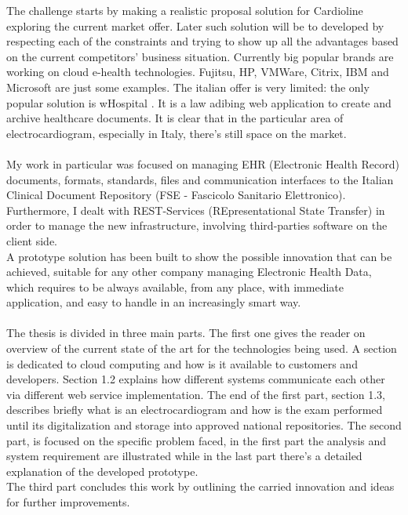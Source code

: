 The challenge starts by making a realistic proposal solution for Cardioline exploring the current market offer. Later such solution will be to developed by respecting each of the constraints and trying to show up all the advantages based on the current competitors' business situation. Currently big popular brands are working on cloud e-health technologies. Fujitsu, HP, VMWare, Citrix, IBM and Microsoft are just some examples. The italian offer is very limited: the only popular solution is wHospital \cite{whospital}. It is a law adibing web application to create and archive healthcare documents. It is clear that in the particular area of electrocardiogram, especially in Italy, there's still space on the market.\\ \\My work in particular was focused on managing EHR (Electronic Health Record) documents, formats, standards, files and communication interfaces to the Italian Clinical Document Repository (FSE - Fascicolo Sanitario Elettronico). Furthermore, I dealt with REST-Services (REpresentational State Transfer) in order to manage the new infrastructure, involving third-parties software on the client side.\\A prototype solution has been built to show the possible innovation that can be achieved, suitable for any other company managing Electronic Health Data, which requires to be always available, from any place, with immediate application, and easy to handle in an increasingly smart way.\\ \\
The thesis is divided in three main parts. The first one gives the reader on overview of the current state of the art for the technologies being used. A section is dedicated to cloud computing and how is it available to customers and developers. Section 1.2 explains how different systems communicate each other via different web service implementation. The end of the first part, section 1.3, describes briefly what is an electrocardiogram and how is the exam performed until its digitalization and storage into approved national repositories. The second part, is focused on the specific problem faced, in the first part the analysis and system requirement are illustrated while in the last part there's a detailed explanation of the developed prototype.\\The third part concludes this work by outlining the carried innovation and ideas for further improvements.
